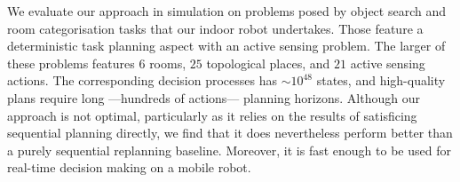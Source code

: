 We evaluate our approach in simulation on problems posed by object
search and room categorisation tasks that our indoor robot
undertakes. Those feature a deterministic task planning aspect with an
active sensing problem. The larger of these problems features $6$
rooms, $25$ topological places, and $21$ active sensing actions. The
corresponding decision processes has $\sim 10^{48}$ states, and
high-quality plans require long ---hundreds of actions--- planning
horizons.
Although our approach is not optimal, particularly as it relies on the
results of satisficing sequential planning directly, we find that it
does nevertheless perform better than a purely sequential replanning
baseline. Moreover, it is fast enough to be used for real-time
decision making on a mobile robot.








